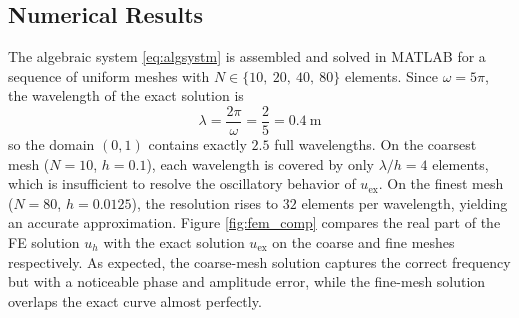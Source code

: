
\subsection{Numerical Results}

The algebraic system \eqref{eq:algsystm} is assembled and solved in MATLAB for a sequence of uniform meshes with \(N \in \{10,\ 20,\ 40,\ 80\}\) elements. Since \(\omega = 5\pi\), the wavelength of the exact solution is
\[
\lambda = \frac{2\pi}{\omega} = \frac{2}{5} = \SI{0.4}{\meter}
\]
so the domain \((0,1)\) contains exactly \(2.5\) full wavelengths. On the coarsest mesh (\(N=10\), \(h=0.1\)), each wavelength is covered by only \(\lambda/h = 4\) elements, which is insufficient to resolve the oscillatory behavior of \(u_{\mathrm{ex}}\). On the finest mesh (\(N=80\), \(h=0.0125\)), the resolution rises to \(32\) elements per wavelength, yielding an accurate approximation. Figure \ref{fig:fem_comp} compares the real part of the FE solution \(u_h\) with the exact solution \(u_{\mathrm{ex}}\) on the coarse and fine meshes respectively. As expected, the coarse-mesh solution captures the correct frequency but with a noticeable phase and amplitude error, while the fine-mesh solution overlaps the exact curve almost perfectly.

